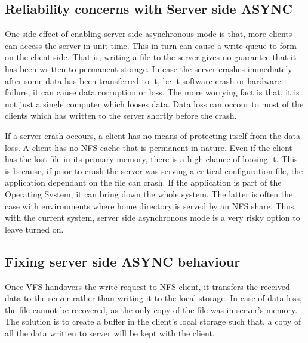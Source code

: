 \documentclass[conference]{IEEEtran}
\begin{document}
\subsection{Reliability concerns with Server side ASYNC}\label{AA}
One side effect of enabling server side asynchronous mode is that, more
clients can access the server in unit time. This in turn can cause a write
queue to form on the client side. That is, writing a file to the server
gives no guarantee that it has been written to permanent storage. In case
the server crashes immediately after some data has been transferred to it,
be it software crash or hardware failure, it can cause data corruption or 
loss. The more worrying fact is that, it is not just a single computer which
looses data. Data loss can occour to most of the clients which has written 
to the server shortly before the crash.

If a server crash occours, a client has no means of protecting itself from
the data loss. A client has no NFS cache that is permanent in nature. Even
if the client has the lost file in its primary memory, there is a high
chance of loosing it. This is because, if prior to crash the server was
serving a critical configuration file, the application dependant on the file
can crash. If the application is part of the Operating System, it can bring
down the whole system. The latter is often the case with environments where
home directory is served by an NFS share. Thus, with the current system,
server side asynchronous mode is a very risky option to leave turned on.

\subsection{Fixing server side ASYNC behaviour}

Once VFS handovers the write request to NFS client, it transfers the 
received data to the server rather than writing it to the local storage. In
case of data loss, the file cannot be recovered, as the only copy of the
file was in server's memory. The solution is to create a buffer in the 
client's local storage such that, a copy of all the data written to server 
will be kept with the client.
\end{document}
